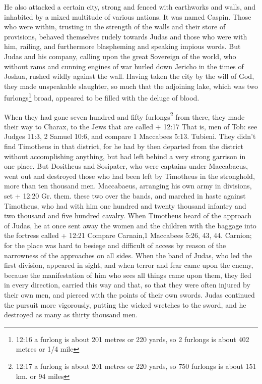  He also attacked a certain city, strong and fenced with
earthworks and walls, and inhabited by a mixed multitude of various
nations. It was named Caspin.  Those who were within,
trusting in the strength of the walls and their store of provisions,
behaved themselves rudely towards Judas and those who were with him,
railing, and furthermore blaspheming and speaking impious words.
 But Judas and his company, calling upon the great
Sovereign of the world, who without rams and cunning engines of war
hurled down Jericho in the times of Joshua, rushed wildly against the
wall.  Having taken the city by the will of God, they made
unspeakable slaughter, so much that the adjoining lake, which was two
furlongs\footnote{12:16 a furlong is about 201 metres or 220 yards, so 2
  furlongs is about 402 metres or 1/4 mile} broad, appeared to be filled
with the deluge of blood.

 When they had gone seven hundred and fifty
furlongs\footnote{12:17 a furlong is about 201 metres or 220 yards, so
  750 furlongs is about 151 km. or 94 miles} from there, they made their
way to Charax, to the Jews that are called + 12:17 That is, men of Tob:
see Judges 11:3, 2 Samuel 10:6, and compare 1 Maccabees 5:13. Tubieni.
 They didn't find Timotheus in that district, for he had by
then departed from the district without accomplishing anything, but had
left behind a very strong garrison in one place.  But
Dositheus and Sosipater, who were captains under Maccabaeus, went out
and destroyed those who had been left by Timotheus in the stronghold,
more than ten thousand men.  Maccabaeus, arranging his own
army in divisions, set + 12:20 Gr. them. these two over the bands, and
marched in haste against Timotheus, who had with him one hundred and
twenty thousand infantry and two thousand and five hundred cavalry.
 When Timotheus heard of the approach of Judas, he at once
sent away the women and the children with the baggage into the fortress
called + 12:21 Compare Carnain,1 Maccabees 5:26, 43, 44. Carnion; for
the place was hard to besiege and difficult of access by reason of the
narrowness of the approaches on all sides.  When the band
of Judas, who led the first division, appeared in sight, and when terror
and fear came upon the enemy, because the manifestation of him who sees
all things came upon them, they fled in every direction, carried this
way and that, so that they were often injured by their own men, and
pierced with the points of their own swords.  Judas
continued the pursuit more vigorously, putting the wicked wretches to
the sword, and he destroyed as many as thirty thousand men.

